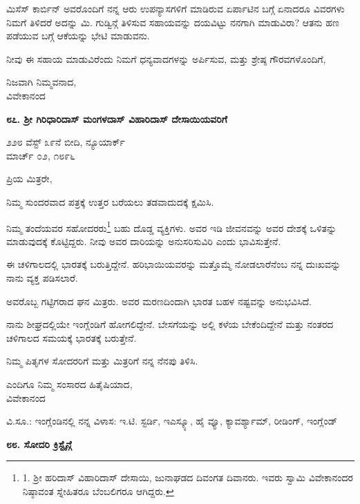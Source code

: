 ಮಿಸೆಸ್ ಕಾರ್ಬಿನ್ ಅವರೊಂದಿಗೆ ನನ್ನ ಆರು ಉಪನ್ಯಾಸಗಳಿಗೆ ಮಾಡಿರುವ ಏರ್ಪಾಟಿನ ಬಗ್ಗೆ ಏನಾದರೂ ವಿವರಗಳು ನಿಮಗೆ ತಿಳಿದರೆ ಅದನ್ನು ಮಿ. ಗುಡ್ವಿನ್ಗೆ ತಿಳಿಸುವ ಸಹಾಯವನ್ನು ದಯವಿಟ್ಟು ನನಗಾಗಿ ಮಾಡುವಿರಾ? ಆತನು ಹಣ ಪಡೆಯುವ ಬಗ್ಗೆ ಆಕೆಯನ್ನು ಭೇಟಿ ಮಾಡುವನು.

ನೀವು ಈ ಸಹಾಯ ಮಾಡುವಿರೆಂದು ನಿಮಗೆ ಧನ್ಯವಾದಗಳನ್ನು ಅರ್ಪಿಸುವ, ಮತ್ತು ಶ್ರೇಷ್ಠ ಗೌರವಗಳೊಂದಿಗೆ,

\begin{flushright}
ನಿಜವಾಗಿ ನಿಮ್ಮವನಾದ,\\ವಿವೇಕಾನಂದ
\end{flushright}

\begin{center}
\textbf{೮೭. ಶ‍್ರೀ ಗಿರಿಧಾರಿದಾಸ್ ಮಂಗಳದಾಸ್ ವಿಹಾರಿದಾಸ್ ದೇಸಾಯಿಯವರಿಗೆ}
\end{center}

\begin{flushright}
೨೨೮ ವೆಸ್ಟ್ ೩೯ನೆ ಬೀದಿ, ನ್ಯೂಯಾರ್ಕ್\\ಮಾರ್ಚ್ ೦೨, ೧೮೯೬
\end{flushright}

ಪ್ರಿಯ ಮಿತ್ರರೇ,

ನಿಮ್ಮ ಸುಂದರವಾದ ಪತ್ರಕ್ಕೆ ಉತ್ತರ ಬರೆಯಲು ತಡವಾದುದಕ್ಕೆ ಕ್ಷಮಿಸಿ.

ನಿಮ್ಮ ತಂದೆಯವರ ಸಹೋದರರು\footnote{1. ಶ‍್ರೀ ಹರಿದಾಸ್ ವಿಹಾರಿದಾಸ್ ದೇಸಾಯಿ, ಜುನಾಘಡದ ದಿವಂಗತ ದಿವಾನರು. ಇವರು ಸ್ವಾಮಿ ವಿವೇಕಾನಂದರ ನಿಷ್ಠಾವಂತ ಸ್ನೇಹಿತರೂ ಬೆಂಬಲಿಗರೂ ಆಗಿದ್ದರು.} ಬಹು ದೊಡ್ಡ ವ್ಯಕ್ತಿಗಳು. ಅವರ ಇಡಿ ಜೀವನವನ್ನು ಅವರ ದೇಶಕ್ಕೆ ಒಳಿತನ್ನು ಮಾಡುವುದಕ್ಕೆ ಕೊಟ್ಟಿದ್ದರು. ನೀವು ಅವರ ದಾರಿಯನ್ನು ಅನುಸರಿಸುವಿರಿ ಎಂದು ಭಾವಿಸುತ್ತೇನೆ.

ಈ ಚಳಿಗಾಲದಲ್ಲಿ ಭಾರತಕ್ಕೆ ಬರುತ್ತಿದ್ದೇನೆ. ಹರಿಭಾಯಿಯವರನ್ನು ಮತ್ತೊಮ್ಮೆ ನೋಡಲಾರೆನೆಂಬ ನನ್ನ ದುಃಖವನ್ನು ನಾನು ವ್ಯಕ್ತ ಪಡಿಸಲಾರೆ.

ಅವರೊಬ್ಬ ಗಟ್ಟಿಗರಾದ ಘನ ಮಿತ್ರರು. ಅವರ ಮರಣದಿಂದಾಗಿ ಭಾರತ ಬಹಳ ನಷ್ಟವನ್ನು ಅನುಭವಿಸಿದೆ.

ನಾನು ಶೀಘ್ರದಲ್ಲಿಯೇ ಇಂಗ್ಲೆಂಡಿಗೆ ಹೋಗಲಿದ್ದೇನೆ. ಬೇಸಗೆಯನ್ನು ಅಲ್ಲಿ ಕಳೆಯ ಬೇಕೆಂದಿದ್ದೇನೆ ಮತ್ತು ನಂತರದ ಚಳಿಗಾಲದ ಸಮಯಕ್ಕೆ ಭಾರತಕ್ಕೆ ಬರುತ್ತೇನೆ.

ನಿಮ್ಮ ಪಿತೃಗಳ ಸೋದರರಿಗೆ ಮತ್ತು ಮಿತ್ರರಿಗೆ ನನ್ನ ನೆನಪು ತಿಳಿಸಿ.

\begin{flushright}
ಎಂದಿಗೂ ನಿಮ್ಮ ಸಂಸಾರದ ಹಿತೈಷಿಯಾದ,\\ವಿವೇಕಾನಂದ
\end{flushright}

ವಿ.ಸೂ.: ಇಂಗ್ಲೆಂಡಿನಲ್ಲಿ ನನ್ನ ವಿಳಾಸ:  ಇ.ಟಿ. ಸ್ಟರ್ಡಿ, ಇಎಸ್ಕ್ಯೂ, ಹೈ ವ್ಯೂ, ಕ್ಯಾವರ್ಶ್ಯಾಮ್​, ರೀಡಿಂಗ್, ಇಂಗ್ಲೆಂಡ್

\begin{center}
\textbf{೮೮. ಸೋದರಿ ಕ್ರಿಸ್ಟೈನ್ಗೆ}
\end{center}

